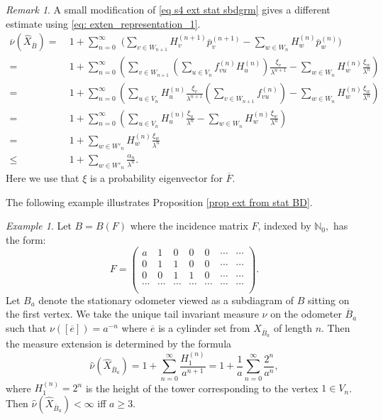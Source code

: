 \documentclass[11pt,reqno]{amsart}
\theoremstyle{definition}
\theoremstyle{remark}
\newtheorem{example}[definition]{Example}
\newtheorem{remark}[definition]{Remark}
\theoremstyle{plain}
\def\ol{\overline}
\def\wh{\widehat}
\newcommand{\N}{\mathbb N}
\newcommand{\ba}{\begin{aligned}}
\newcommand{\ea}{\end{aligned}}
\numberwithin{equation}{section}
\begin{document}
\begin{remark}
A small modification of \eqref{eq s4 ext stat sbdgrm} gives a different estimate using \eqref{eq: exten_representation_1}.
$$
\ba 
\ol \nu(\wh X_{\ol B})  = &\ 1+   \sum_{n=0}^\infty \,\,\bigg( \sum_{v \in W_{n+1}}
H_v^{(n+1)}\overline p_v^{(n+1)} - 
 \sum_{w \in W_{n}} H_w^{(n)}\overline p_w^{(n)}\bigg)\\
= &\ 1+ \sum_{n = 0}^{\infty} \left( \sum_{v \in W_{n+1}} \left(\sum_{u \in V_n} f_{vu}^{(n)} H^{(n)}_u\right) \frac{\xi_v}{\lambda^{n+1}} - \sum_{w \in W_{n}} H^{(n)}_w \frac{\xi_w}{\lambda^{n}}\right)\\
= &\ 1+ \sum_{n = 0}^{\infty} \left( \sum_{u \in V_n}H^{(n)}_u \frac{\xi_v}{\lambda^{n+1}} \left(\sum_{v \in W_{n+1}} f_{vu}^{(n)}\right)  - \sum_{w \in W_{n}} H^{(n)}_w \frac{\xi_w}{\lambda^{n}}\right)\\
=&\ 1+ \sum_{n = 0}^{\infty} \left( \sum_{u \in V_n}H^{(n)}_u \frac{\xi_u}{\lambda^n} - \sum_{w \in W_{n}}
H^{(n)}_w \frac{\xi_w}{\lambda^{n}}\right)\\
= &\ 1+ \sum_{w \in W'_n}H^{(n)}_w \frac{\xi_w}{\lambda^{n}}\\
\leq &\ 1+ \sum_{w \in W'_n} \frac{\alpha_n}{\lambda^n}.
\ea
$$ Here we use that $\xi$ is a probability eigenvector for $\ol F$.
\end{remark} 

The following example illustrates Proposition \ref{prop ext from stat BD}.

\begin{example}
Let $B = B(F)$ where the incidence matrix $F$, indexed by $\N_0, $ has the form:
$$
F =  \begin{pmatrix}
    a & 1 &  0 & 0 & 0 & \cdots & \cdots \\
    0 & 1 & 1 & 0 & 0 & \cdots & \cdots\\
    0 & 0 & 1 & 1 & 0 & \cdots & \cdots  \\
\cdots & \cdots & \cdots & \cdots & \cdots & \cdots & \cdots  \\
\end{pmatrix}.
$$
Let $B_a$ denote the stationary odometer viewed as a subdiagram of $B$ sitting on the first vertex. We take the unique tail invariant measure $\nu$ on the odometer $\ol B_a$ such that $\nu ([\ol e]) = a^{-n}$ where $\ol e$ is a cylinder set
from $X_{\ol B_a}$ of length $n$. Then the measure extension is determined by the formula
$$
\wh \nu(\wh X_{\ol B_a}) = 1 + \sum_{n = 0}^{\infty} \frac{H_1^{(n)}}{a^{n+1}}
= 1 + \frac{1}{a} \sum_{n = 0}^{\infty} \frac{2^n}{a^{n}}, 
$$
where $H_1^{(n)} = 2^n$ is the height of the tower corresponding to the vertex $1 \in V_n$. 
Then $\wh \nu(\wh X_{\ol B_a}) < \infty$ iff $a \geq 3$. 
\end{example}
\end{document}
